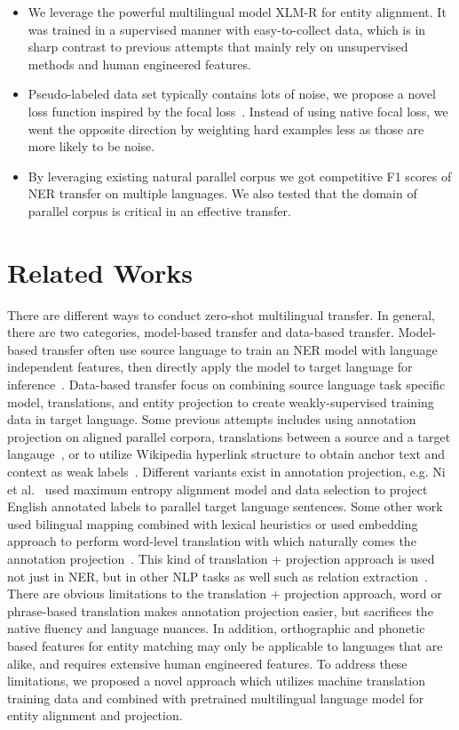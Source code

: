 \documentclass[11pt]{article}
\begin{document}
\begin{itemize}
	\item We leverage the powerful multilingual model XLM-R for entity alignment. It was trained in a supervised manner with easy-to-collect data, which is in sharp contrast to previous attempts that mainly rely on unsupervised methods and human engineered features.
	\item Pseudo-labeled data set typically contains lots of noise, we propose a novel loss function inspired by the focal loss~\cite{focal}. Instead of using native focal loss, we went the opposite direction by weighting hard examples less as those are more likely to be noise.
	\item By leveraging existing natural parallel corpus we got competitive F1 scores of NER transfer on multiple languages. We also tested that the domain of parallel corpus is critical in an effective transfer.
\end{itemize}

\section{Related Works}
\label{section:work}
There are different ways to conduct zero-shot multilingual transfer. In general, there are two categories, model-based transfer and data-based transfer. Model-based transfer often use source language to train an NER model with language independent features, then directly apply the model to target language for inference~\cite{wu2019beto, wu2020enhanced}. Data-based transfer focus on combining source language task specific model, translations, and entity projection to create weakly-supervised training data in target language. Some previous attempts includes using annotation projection on aligned parallel corpora, translations between a source and a target langauge~\cite{Ni2017, ehrmann11}, or to utilize Wikipedia hyperlink structure to obtain anchor text and context as weak labels~\cite{alrfou15, TsaiMaRo16}. Different variants exist in annotation projection, e.g. Ni et al.~\cite{Ni2017} used maximum entropy alignment model and data selection to project English annotated labels to parallel target language sentences. Some other work used bilingual mapping combined with lexical heuristics or used embedding approach to perform word-level translation with which naturally comes the annotation projection~\cite{D17-1268, xie-etal-2018-neural, jain2019entity}. This kind of translation + projection approach is used not just in NER, but in other NLP tasks as well such as relation extraction~\cite{Faruqui:2015naaclshort}. There are obvious limitations to the translation + projection approach, word or phrase-based translation makes annotation projection easier, but sacrifices the native fluency and language nuances. In addition, orthographic and phonetic based features for entity matching may only be applicable to languages that are alike, and requires extensive human engineered features. To address these limitations, we proposed a novel approach which utilizes machine translation training data and combined with pretrained multilingual language model for entity alignment and projection. 
\end{document}
